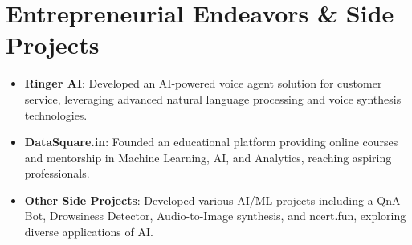 \documentclass[letterpaper,11pt]{article}
\newcommand{\resumeItem}[2]{
  \item\small{
    \textbf{#1}{: #2 \vspace{-2pt}}
  }
}
\newcommand{\resumeSubItem}[2]{\resumeItem{#1}{#2}\vspace{-4pt}}
\newcommand{\resumeSubHeadingListStart}{\begin{itemize}[leftmargin=*]}
\newcommand{\resumeSubHeadingListEnd}{\end{itemize}}
\begin{document}
\section{Entrepreneurial Endeavors \& Side Projects}
  \resumeSubHeadingListStart
    \resumeSubItem{Ringer AI}{Developed an AI-powered voice agent solution for customer service, leveraging advanced natural language processing and voice synthesis technologies.}
    \resumeSubItem{DataSquare.in}{Founded an educational platform providing online courses and mentorship in Machine Learning, AI, and Analytics, reaching aspiring professionals.}
    \resumeSubItem{Other Side Projects}{Developed various AI/ML projects including a QnA Bot, Drowsiness Detector, Audio-to-Image synthesis, and ncert.fun, exploring diverse applications of AI.}
  \resumeSubHeadingListEnd
\end{document}
